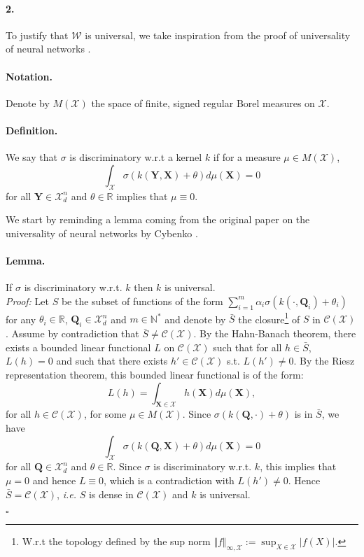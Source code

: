 \documentclass[letterpaper]{article} \usepackage{aaai22}  \usepackage{times}  \usepackage{helvet}  \usepackage{courier}  \usepackage[hyphens]{url}  \usepackage{graphicx} \urlstyle{rm} \def\UrlFont{\rm}  \usepackage{natbib}  \usepackage{caption} \DeclareCaptionStyle{ruled}{labelfont=normalfont,labelsep=colon,strut=off} \frenchspacing  \setlength{\pdfpagewidth}{8.5in}  \setlength{\pdfpageheight}{11in}  \usepackage{algorithm}
\newcommand{\X}{{\mathbf X}}
\newcommand{\Q}{{\mathbf Q}}
\begin{document}
\paragraph{2.} To justify that $\mathcal{W}$ is universal, we take inspiration from the proof of universality of neural networks \cite{cybenko1989approximation}.

\paragraph{Notation.} Denote by $M(\mathcal{X})$ the space of finite, signed regular Borel measures on $\mathcal{X}$. 

\paragraph{Definition.} We say that $\sigma$ is discriminatory w.r.t a kernel $k$ if for a measure $\mu\in M(\mathcal{X})$, $$\int_{\mathcal{X}} \sigma(k(\mathbf Y,\X)+\theta)d\mu(\X) = 0$$ for all $\mathbf Y\in\mathcal{X}^n_d$ and $\theta\in\mathbb{R}$ implies that $\mu \equiv 0$.

We start by reminding a lemma coming from the original paper on the universality of neural networks by Cybenko \cite{cybenko1989approximation}.\\

\paragraph{Lemma.} If $\sigma$ is discriminatory w.r.t. $k$ then $k$ is universal.\\

\textit{Proof:} Let $S$ be the subset of functions of the form $\sum_{i=1}^m\alpha_i\sigma(k(\cdot,\Q_i)+\theta_i)$ for any $\theta_i\in\mathbb{R}$, $\Q_i\in\mathcal{X}_d^n$ and $m\in\mathbb{N}^*$ and denote by $\bar{S}$ the closure\footnote{W.r.t the topology defined by the sup norm $\Vert f\Vert_{\infty,\mathcal{X}}:=\sup_{X\in\mathcal{X}}\vert f(X)\vert$.} of $S$ in $\mathcal{C}(\mathcal{X})$. Assume by contradiction that $\bar{S} \neq \mathcal{C}(\mathcal{X})$. By the Hahn-Banach theorem, there exists a bounded linear functional $L$ on $\mathcal{C}(\mathcal{X})$ such that for all $h\in \bar{S}$, $L(h)=0$ and such that there exists $h'\in\mathcal{C}(\mathcal{X})$ s.t. $L(h')\neq  0$. By the Riesz representation theorem, this bounded linear functional is of the form:
$$L(h)= \int_{\X\in\mathcal{X}} h(\X)d\mu(\X),$$
for all $h\in\mathcal{C}(\mathcal{X})$, for some $\mu\in M(\mathcal{X})$. Since $\sigma(k(\Q,\cdot)+\theta)$ is in $\bar{S}$, we have  $$\int_{\mathcal{X}} \sigma(k(\Q,\X)+\theta)d\mu(\X) = 0$$ for all $\Q\in\mathcal{X}^n_d$ and $\theta\in\mathbb{R}$. Since $\sigma$ is discriminatory w.r.t. $k$, this implies that $\mu=0$ and hence $L\equiv0$, which is a contradiction with $L(h')\neq  0$. Hence $\bar{S} = \mathcal{C}(\mathcal{X})$, \textit{i.e.} $S$ is dense in $\mathcal{C}(\mathcal{X})$ and $k$ is universal.
\begin{flushright}
$\square$
\end{flushright}
\end{document}
